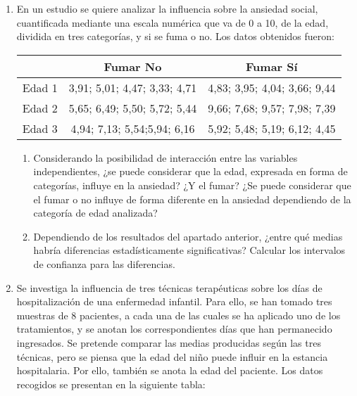 \begin{enumerate}

\item En un estudio se quiere analizar la influencia sobre la ansiedad social, cuantificada mediante una escala numérica que va de 0 a 10, de la edad, dividida en tres categorías, y si se fuma o no. Los datos obtenidos fueron:

\begin{center}

\begin{tabular}{|l|l|l|}
\cline{2-3}
\multicolumn{1}{c|}{} & \multicolumn{1}{c|}{Fumar No} & \multicolumn{1}{c|}{Fumar Sí} \\
\hline
\multicolumn{1}{|c|}{Edad 1} & \multicolumn{1}{c|}{3,91; 5,01; 4,47; 3,33; 4,71} & \multicolumn{1}{c|}{4,83; 3,95; 4,04; 3,66; 9,44} \\
\hline
\multicolumn{1}{|c|}{Edad 2} & \multicolumn{1}{c|}{5,65; 6,49; 5,50; 5,72; 5,44} & \multicolumn{1}{c|}{9,66; 7,68; 9,57; 7,98; 7,39} \\
\hline
\multicolumn{1}{|c|}{Edad 3} & \multicolumn{1}{c|}{4,94; 7,13; 5,54;5,94; 6,16} & \multicolumn{1}{c|}{5,92; 5,48; 5,19; 6,12; 4,45} \\
\hline
\end{tabular}
\end{center}


\begin{enumerate}

\item Considerando la posibilidad de interacción entre las variables independientes, ¿se puede considerar que la edad, expresada en forma de categorías, influye en la ansiedad? ¿Y el fumar? ¿Se puede considerar que el fumar o no influye de forma diferente en la ansiedad dependiendo de la categoría de edad analizada?

\item Dependiendo de los resultados del apartado anterior, ¿entre qué medias habría diferencias estadísticamente significativas? Calcular los intervalos de confianza para las diferencias.

\end{enumerate}




\item Se investiga la influencia de tres técnicas terapéuticas sobre los días de hospitalización de una enfermedad infantil. Para ello, se han tomado tres muestras de 8 pacientes, a cada una de las cuales se ha aplicado uno de los tratamientos, y se anotan los correspondientes días que han permanecido ingresados. Se pretende comparar las medias producidas según las tres técnicas, pero se piensa que la edad del niño puede influir en la estancia hospitalaria. Por ello, también se anota la edad del paciente. Los datos recogidos se presentan en la siguiente tabla:


\end{enumerate}

